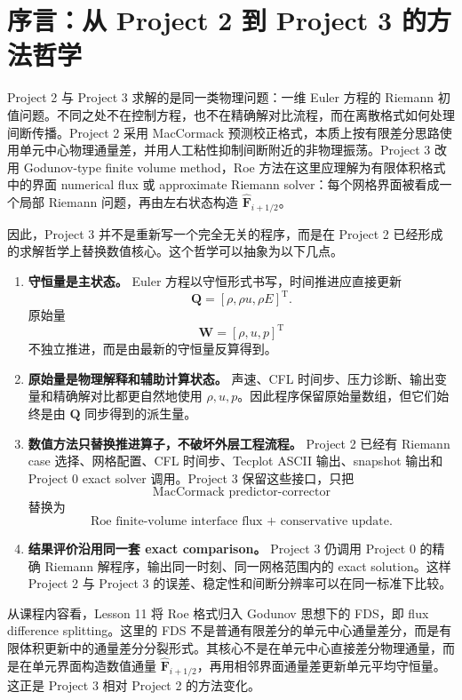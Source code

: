 \section{序言：从 Project 2 到 Project 3 的方法哲学}

Project 2 与 Project 3 求解的是同一类物理问题：一维 Euler 方程的 Riemann 初值问题。不同之处不在控制方程，也不在精确解对比流程，而在离散格式如何处理间断传播。Project 2 采用 MacCormack 预测校正格式，本质上按有限差分思路使用单元中心物理通量差，并用人工粘性抑制间断附近的非物理振荡。Project 3 改用 Godunov-type finite volume method，Roe 方法在这里应理解为有限体积格式中的界面 numerical flux 或 approximate Riemann solver：每个网格界面被看成一个局部 Riemann 问题，再由左右状态构造 \(\hat{\bm F}_{i+1/2}\)。

因此，Project 3 并不是重新写一个完全无关的程序，而是在 Project 2 已经形成的求解哲学上替换数值核心。这个哲学可以抽象为以下几点。

\begin{enumerate}[leftmargin=2em]
    \item \textbf{守恒量是主状态。} Euler 方程以守恒形式书写，时间推进应直接更新
    \[
        \bm Q = [\rho,\rho u,\rho E]^{\mathrm T}.
    \]
    原始量
    \[
        \bm W = [\rho,u,p]^{\mathrm T}
    \]
    不独立推进，而是由最新的守恒量反算得到。

    \item \textbf{原始量是物理解释和辅助计算状态。} 声速、CFL 时间步、压力诊断、输出变量和精确解对比都更自然地使用 \(\rho,u,p\)。因此程序保留原始量数组，但它们始终是由 \(\bm Q\) 同步得到的派生量。

    \item \textbf{数值方法只替换推进算子，不破坏外层工程流程。} Project 2 已经有 Riemann case 选择、网格配置、CFL 时间步、Tecplot ASCII 输出、snapshot 输出和 Project 0 exact solver 调用。Project 3 保留这些接口，只把
    \[
        \text{MacCormack predictor-corrector}
    \]
    替换为
    \[
        \text{Roe finite-volume interface flux + conservative update}.
    \]

    \item \textbf{结果评价沿用同一套 exact comparison。} Project 3 仍调用 Project 0 的精确 Riemann 解程序，输出同一时刻、同一网格范围内的 exact solution。这样 Project 2 与 Project 3 的误差、稳定性和间断分辨率可以在同一标准下比较。
\end{enumerate}

从课程内容看，Lesson 11 将 Roe 格式归入 Godunov 思想下的 FDS，即 flux difference splitting。这里的 FDS 不是普通有限差分的单元中心通量差分，而是有限体积更新中的通量差分分裂形式。其核心不是在单元中心直接差分物理通量，而是在单元界面构造数值通量 \(\hat{\bm F}_{i+1/2}\)，再用相邻界面通量差更新单元平均守恒量。这正是 Project 3 相对 Project 2 的方法变化。


